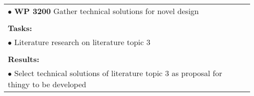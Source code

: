 \begin{table}[!h]
\begin{center}
\begin{tabular}{|p{}||p{}|p{}||p{}|}
            \multicolumn{4}{|p{.95\columnwidth}|}{$\bullet$ \textbf{WP 3200} Gather technical solutions for novel design}\\
            \multicolumn{4}{|p{.95\columnwidth}|}{}\\
            \multicolumn{4}{|p{.95\columnwidth}|}{\textbf{Tasks:}}\\
            \multicolumn{4}{|p{.95\columnwidth}|}{$\bullet$ Literature research on literature topic 3}\\            \multicolumn{4}{|p{.95\columnwidth}|}{}\\
            \multicolumn{4}{|p{.95\columnwidth}|}{\textbf{Results:}}\\
            \multicolumn{4}{|p{.95\columnwidth}|}{$\bullet$ Select technical solutions of literature topic 3 as proposal for thingy to be developed}\\
            \hline
        \end{tabular}
    \end{center}
\end{table}

\clearpage


